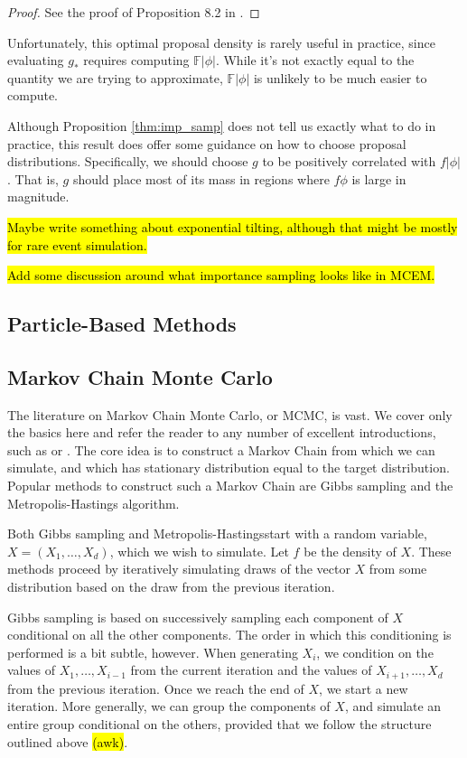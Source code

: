 \documentclass[11pt, oneside]{article}   	%
\newcommand{\bF}{\mathbb{F}}
\newcommand{\mh}{Metropolis-Hastings}
\begin{document}
\begin{proof}
    See the proof of Proposition 8.2 in \citet{Cho20}.
\end{proof}
%
Unfortunately, this optimal proposal density is rarely useful in practice, since evaluating $g_*$ requires computing $\bF |\phi|$. While it's not exactly equal to the quantity we are trying to approximate, $\bF |\phi|$ is unlikely to be much easier to compute.

Although Proposition \ref{thm:imp_samp} does not tell us exactly what to do in practice, this result does offer some guidance on how to choose proposal distributions. Specifically, we should choose $g$ to be positively correlated with $f |\phi|$. That is, $g$ should place most of its mass in regions where $f \phi$ is large in magnitude.

\hl{Maybe write something about exponential tilting, although that might be mostly for rare event simulation.}

\hl{Add some discussion around what importance sampling looks like in MCEM.}

\subsection{Particle-Based Methods}

\subsection{Markov Chain Monte Carlo}

The literature on Markov Chain Monte Carlo, or MCMC, is vast. We cover only the basics here and refer the reader to any number of excellent introductions, such as \citet{Gel13} or \citet{Rob04}. The core idea is to construct a Markov Chain from which we can simulate, and which has stationary distribution equal to the target distribution. Popular methods to construct such a Markov Chain are Gibbs sampling and the Metropolis-Hastings algorithm. 

Both Gibbs sampling and \mh start with a random variable, $X = (X_1, \ldots, X_d)$, which we wish to simulate. Let $f$ be the density of $X$. These methods proceed by iteratively simulating draws of the vector $X$ from some distribution based on the draw from the previous iteration. 

Gibbs sampling is based on successively sampling each component of $X$ conditional on all the other components. The order in which this conditioning is performed is a bit subtle, however. When generating $X_i$, we condition on the values of $X_1,\ldots, X_{i-1}$ from the current iteration and the values of $X_{i+1}, \ldots, X_d$ from the previous iteration. Once we reach the end of $X$, we start a new iteration.  More generally, we can group the components of $X$, and simulate an entire group conditional on the others, provided that we follow the structure outlined above \hl{(awk)}.
\end{document}
